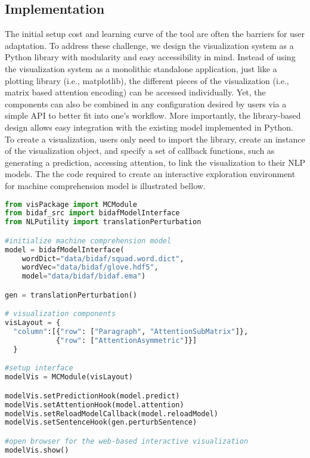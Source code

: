 \subsection{Implementation}
The initial setup cost and learning curve of the tool are often the barriers for user adaptation. To address these challenge, we design the visualization system as a Python library with modularity and easy accessibility in mind.
Instead of using the visualization system as a monolithic standalone application, just like a plotting library (i.e., matplotlib), the different pieces of the visualization (i.e., matrix based attention encoding) can be accessed individually.
% 
Yet, the components can also be combined in any configuration desired by users via a simple API to better fit into one's workflow.
More importantly, the library-based design allows easy integration with the existing model implemented in Python.
%
To create a visualization, users only need to import the library, create an instance of the visualization object, and specify a set of callback functions, such as generating a prediction, accessing attention, to link the visualization to their NLP models. The the code required to create an interactive exploration environment for machine comprehension model is illustrated bellow.

\begin{lstlisting}[language=Python, caption=Code for setting up the visualization system shown in the paper.]
from visPackage import MCModule
from bidaf_src import bidafModelInterface
from NLPutility import translationPerturbation

#initialize machine comprehension model
model = bidafModelInterface(
    wordDict="data/bidaf/squad.word.dict",
    wordVec="data/bidaf/glove.hdf5",
    model="data/bidaf/bidaf.ema")

gen = translationPerturbation()

# visualization components
visLayout = {
  "column":[{"row": ["Paragraph", "AttentionSubMatrix"]},
            {"row": ["AttentionAsymmetric"]}]
  }

#setup interface
modelVis = MCModule(visLayout)

modelVis.setPredictionHook(model.predict)
modelVis.setAttentionHook(model.attention)
modelVis.setReloadModelCallback(model.reloadModel)
modelVis.setSentenceHook(gen.perturbSentence)

#open browser for the web-based interactive visualization
modelVis.show()
\end{lstlisting}



